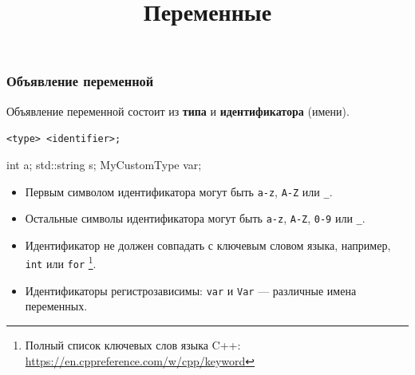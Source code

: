 \documentclass[compress, 8pt, aspectratio=169]{beamer}
\title{Переменные}
\begin{document}
\frame[plain]{\titlepage}

\begin{frame}[fragile]

    \frametitle{Объявление переменной}

    Объявление переменной состоит из \textbf{типа} и \textbf{идентификатора} (имени).

    \begin{center}

        \verb|<type> <identifier>;|

        \begin{myinplacelisting}[minted language=cpp]
int a;
std::string s;
MyCustomType var;
        \end{myinplacelisting}

    \end{center}

    \begin{itemize}

        \item Первым символом идентификатора могут быть \verb|a-z|, \verb|A-Z| или \verb|_|.

        \item Остальные символы идентификатора могут быть \verb|a-z|,
            \verb|A-Z|, \verb|0-9| или \verb|_|.

        \item Идентификатор не должен совпадать с ключевым словом языка,
            например, \verb|int| или \verb|for|
            \footnote{Полный список ключевых слов языка C++:
                \url{https://en.cppreference.com/w/cpp/keyword}}.

        \item Идентификаторы регистрозависимы: \verb|var| и \verb|Var| ---
            различные имена переменных.

    \end{itemize}

\end{frame}
\end{document}
